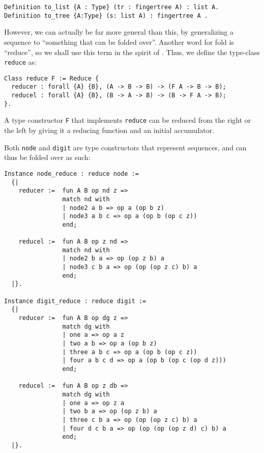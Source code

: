 \documentclass{article}
\newcommand{\code}[1]{\texttt{#1}}
\begin{document}
\begin{verbatim}
Definition to_list {A : Type} (tr : fingertree A) : list A.
Definition to_tree {A:Type} (s: list A) : fingertree A .
\end{verbatim}

However, we can actually be far more general than this, by generalizing a sequence
to ``something that can be folded over''. Another word for fold is ``reduce'', so
we shall use this term in the spirit of \cite{Hinze-Paterson:FingerTree}.
Thus, we define the type-class \code{reduce} as:

\begin{verbatim}
Class reduce F := Reduce {
  reducer : forall {A} {B}, (A -> B -> B) -> (F A -> B -> B);
  reducel : forall {A} {B}, (B -> A -> B) -> (B -> F A -> B);
}.
\end{verbatim}

A type constructor \code{F} that implements \code{reduce} can be reduced from the
right or the left by giving it a reducing function and an initial accumulator.

Both \code{node} and \code{digit} are type constructors that represent sequences,
and can thus be folded over as such:

\begin{listing}[H]
\begin{verbatim}
Instance node_reduce : reduce node :=
  {|
    reducer :=  fun A B op nd z =>
                match nd with
                | node2 a b => op a (op b z)
                | node3 a b c => op a (op b (op c z))
                end;

    reducel :=  fun A B op z nd =>
                match nd with
                | node2 b a => op (op z b) a
                | node3 c b a => op (op (op z c) b) a
                end;
  |}.

Instance digit_reduce : reduce digit :=
  {|
    reducer :=  fun A B op dg z =>
                match dg with
                | one a => op a z
                | two a b => op a (op b z)
                | three a b c => op a (op b (op c z))
                | four a b c d => op a (op b (op c (op d z)))
                end;

    reducel :=  fun A B op z db =>
                match dg with
                | one a => op z a
                | two b a => op (op z b) a
                | three c b a => op (op (op z c) b) a
                | four d c b a => op (op (op (op z d) c) b) a
                end;
  |}.
\end{verbatim}
\end{listing}
\end{document}
